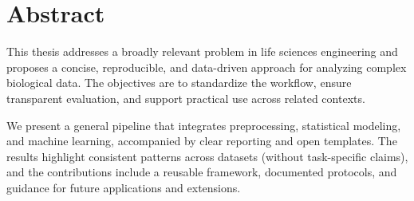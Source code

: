 \documentclass[a4paper,11pt]{article}
\begin{document}


\newpage

\null
\thispagestyle{empty}

\newpage




\newpage

\null
\thispagestyle{empty}

\newpage

\section*{Abstract}

\noindent This thesis addresses a broadly relevant problem in life sciences engineering and proposes a concise, reproducible, and data-driven approach for analyzing complex biological data. The objectives are to standardize the workflow, ensure transparent evaluation, and support practical use across related contexts.

\noindent We present a general pipeline that integrates preprocessing, statistical modeling, and machine learning, accompanied by clear reporting and open templates. The results highlight consistent patterns across datasets (without task-specific claims), and the contributions include a reusable framework, documented protocols, and guidance for future applications and extensions.

\newpage

\null
\thispagestyle{empty}


\newpage



\newpage

\null
\thispagestyle{empty}

\newpage

\tableofcontents

\newpage

\null
\thispagestyle{empty}

\newpage





\newpage



\newpage



\newpage



\newpage



\newpage



\newpage
\null
\newpage

\printbibliography
\end{document}
